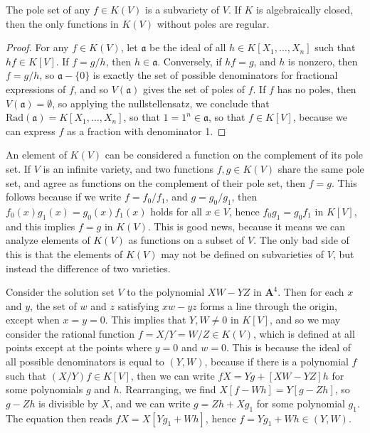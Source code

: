 \begin{prop}
    The pole set of any $f \in K(V)$ is a subvariety of $V$. If $K$ is algebraically closed, then the only functions in $K(V)$ without poles are regular.
\end{prop}
\begin{proof}
    For any $f \in K(V)$, let $\mathfrak{a}$ be the ideal of all $h \in K[X_1, \dots, X_n]$ such that $hf \in K[V]$. If $f = g/h$, then $h \in \mathfrak{a}$. Conversely, if $hf = g$, and $h$ is nonzero, then $f = g/h$, so $\mathfrak{a} - \{ 0 \}$ is exactly the set of possible denominators for fractional expressions of $f$, and so $V(\mathfrak{a})$ gives the set of poles of $f$. If $f$ has no poles, then $V(\mathfrak{a}) = \emptyset$, so applying the nullstellensatz, we conclude that $\text{Rad}(\mathfrak{a}) = K[X_1, \dots, X_n]$, so that $1 = 1^n \in \mathfrak{a}$, so that $f \in K[V]$, because we can express $f$ as a fraction with denominator 1.
\end{proof}

An element of $K(V)$ can be considered a function on the complement of its pole set. If $V$ is an infinite variety, and two functions $f,g \in K(V)$ share the same pole set, and agree as functions on the complement of their pole set, then $f = g$. This follows because if we write $f = f_0/f_1$, and $g = g_0/g_1$, then $f_0(x) g_1(x) = g_0(x) f_1(x)$ holds for all $x \in V$, hence $f_0g_1 = g_0f_1$ in $K[V]$, and this implies $f = g$ in $K(V)$. This is good news, because it means we can analyze elements of $K(V)$ as functions on a subset of $V$. The only bad side of this is that the elements of $K(V)$ may not be defined on subvarieties of $V$, but instead the difference of two varieties.

\begin{example}
    Consider the solution set $V$ to the polynomial $XW - YZ$ in $\mathbf{A}^4$. Then for each $x$ and $y$, the set of $w$ and $z$ satisfying $xw - yz$ forms a line through the origin, except when $x = y = 0$. This implies that $Y,W \neq 0$ in $K[V]$, and so we may consider the rational function $f = X/Y = W/Z \in K(V)$, which is defined at all points except at the points where $y = 0$ and $w = 0$. This is because the ideal of all possible denominators is equal to $(Y,W)$, because if there is a polynomial $f$ such that $(X/Y)f \in K[V]$, then we can write $fX = Yg + [XW - YZ]h$ for some polynomials $g$ and $h$. Rearranging, we find $X[f - Wh] = Y[g-Zh]$, so $g - Zh$ is divisible by $X$, and we can write $g = Zh + Xg_1$ for some polynomial $g_1$. The equation then reads $fX = X[Yg_1 + Wh]$, hence $f = Yg_1 + Wh \in (Y,W)$.
\end{example}

